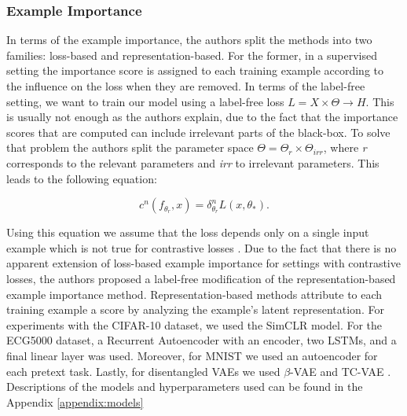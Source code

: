 \subsubsection{Example Importance}

In terms of the example importance, the authors split the methods into two families: loss-based and representation-based. For the former, in a supervised setting the importance score is assigned to each training example according to the influence on the loss when they are removed. In terms of the label-free setting, we want to train our model using a label-free loss $L = X \times \Theta \rightarrow H$. This is usually not enough as the authors explain, due to the fact that the importance scores that are computed can include irrelevant parts of the black-box. To solve that problem the authors split the parameter space $\Theta = \Theta_r \times \Theta_{irr}$, where \textit{r} corresponds to the relevant parameters and \textit{irr} to irrelevant parameters. This leads to the following equation: 

\begin{equation}
    c^n\left(f_{\theta_r},x\right)=\delta_{\theta_r}^nL\left(x,\theta_*\right) .
\end{equation}



Using this equation we assume that the loss depends only on a single input example which is not true for contrastive losses \cite{simclrref}. Due to the fact that there is no apparent extension of loss-based example importance for settings with contrastive losses, the authors proposed a label-free modification of the representation-based example importance method. Representation-based methods attribute to each training example a score by analyzing the example's latent representation. For experiments with the CIFAR-10 dataset, we used the SimCLR model. For the ECG5000 dataset, a Recurrent Autoencoder with an encoder, two LSTMs, and a final linear layer was used.
Moreover, for MNIST we used an autoencoder for each pretext task. Lastly, for disentangled VAEs we used $\beta$-VAE \cite{betavae} and TC-VAE \cite{tcvae}. Descriptions of the models and hyperparameters used can be found in the Appendix \ref{appendix:models}


